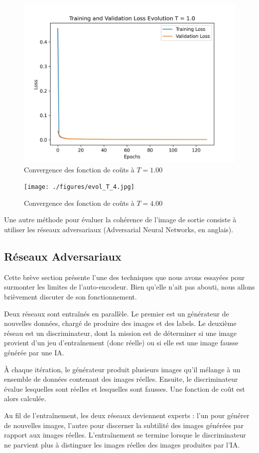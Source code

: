 \documentclass[11pt, parskip=half]{scrartcl} %
\begin{document}
\begin{figure}[h]
	\centering
	\includegraphics[width=0.5\linewidth]{./figures/evol_T_1.jpg}
	\caption{Convergence des fonction de coûts à $T = 1.00$}
	\label{fig:T1}
\end{figure}
\begin{figure}[h]
	\centering
	\texttt{[image: ./figures/evol\_T\_4.jpg]}
	\caption{Convergence des fonction de coûts à $T = 4.00$}
	\label{fig:T4}
\end{figure}

Une autre méthode pour évaluer la cohérence de l'image de sortie consiste à utiliser les réseaux adversariaux (Adversarial Neural Networks, en anglais).

\subsection{Réseaux Adversariaux}

Cette brève section présente l'une des techniques que nous avons essayées pour surmonter les limites de l'auto-encodeur. Bien qu'elle n'ait pas abouti, nous allons brièvement discuter de son fonctionnement.

Deux réseaux sont entraînés en parallèle. Le premier est un générateur de nouvelles données, chargé de produire des images et des labels. Le deuxième réseau est un discriminateur, dont la mission est de déterminer si une image provient d'un jeu d'entraînement (donc réelle) ou si elle est une image fausse générée par une IA.

À chaque itération, le générateur produit plusieurs images qu'il mélange à un ensemble de données contenant des images réelles. Ensuite, le discriminateur évalue lesquelles sont réelles et lesquelles sont fausses. Une fonction de coût est alors calculée.

Au fil de l'entraînement, les deux réseaux deviennent experts : l'un pour générer de nouvelles images, l'autre pour discerner la subtilité des images générées par rapport aux images réelles. L'entraînement se termine lorsque le discriminateur ne parvient plus à distinguer les images réelles des images produites par l'IA.
\end{document}

